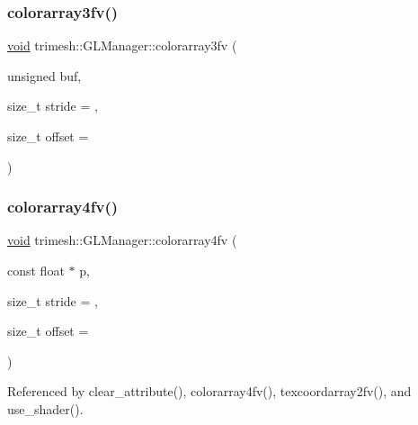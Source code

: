 \mbox{\label{classtrimesh_1_1GLManager_a15725aee5f1a5c0b2e0a416bd862912d}} 
\subsubsection{\texorpdfstring{colorarray3fv()}{colorarray3fv()}\hspace{0.1cm}{\footnotesize\ttfamily [3/3]}}
{\footnotesize\ttfamily \hyperlink{namespacetrimesh_a784ddfd979e1c579bda795a8edfc3f43}{void} trimesh\+::\+G\+L\+Manager\+::colorarray3fv (\begin{DoxyParamCaption}\item[{unsigned}]{buf,  }\item[{size\+\_\+t}]{stride = {},  }\item[{size\+\_\+t}]{offset = {} }\end{DoxyParamCaption})}

\mbox{\label{classtrimesh_1_1GLManager_a5428a45c51c6e002f99f12fa4565eb87}} 
\subsubsection{\texorpdfstring{colorarray4fv()}{colorarray4fv()}\hspace{0.1cm}{\footnotesize\ttfamily [1/3]}}
{\footnotesize\ttfamily \hyperlink{namespacetrimesh_a784ddfd979e1c579bda795a8edfc3f43}{void} trimesh\+::\+G\+L\+Manager\+::colorarray4fv (\begin{DoxyParamCaption}\item[{const float $\ast$}]{p,  }\item[{size\+\_\+t}]{stride = {},  }\item[{size\+\_\+t}]{offset = {} }\end{DoxyParamCaption})}



Referenced by clear\+\_\+attribute(), colorarray4fv(), texcoordarray2fv(), and use\+\_\+shader().

\mbox{\label{classtrimesh_1_1GLManager_a7e76c5d67ea03cc3ee42eff380cbcda4}} 
